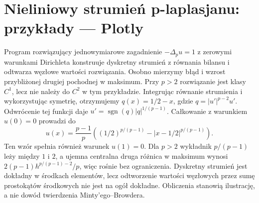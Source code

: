 \section{Nieliniowy strumień p-laplasjanu: przykłady — Plotly}
\label{sec:pde26-code}
Program rozwiązujący jednowymiarowe zagadnienie $-\Delta_pu=1$
z zerowymi warunkami Dirichleta konstruuje dyskretny strumień
z równania bilansu i odtwarza węzłowe wartości rozwiązania.
Osobno mierzymy błąd i wzrost przybliżonej drugiej pochodnej
w maksimum. Przy $p>2$ rozwiązanie jest klasy $C^1$,
lecz nie należy do $C^2$ w tym przykładzie.
Integrując równanie strumienia i wykorzystując
symetrię, otrzymujemy $q(x)=1/2-x$, gdzie
$q=|u'|^{p-2}u'$. Odwrócenie tej funkcji daje
$u'=\operatorname{sgn}(q)|q|^{1/(p-1)}$.
Całkowanie z warunkiem $u(0)=0$ prowadzi do
\[
 u(x)=\frac{p-1}{p}
 \left((1/2)^{p/(p-1)}-|x-1/2|^{p/(p-1)}\right).
\]
Ten wzór spełnia również warunek $u(1)=0$.
Dla $p>2$ wykładnik $p/(p-1)$ leży między $1$ i $2$,
a ujemna centralna druga różnica w maksimum wynosi
$2(p-1)h^{p/(p-1)-2}/p$, więc rośnie bez ograniczenia.
Dyskretny strumień jest dokładny w środkach elementów,
lecz odtworzenie wartości węzłowych przez sumę
prostokątów środkowych nie jest na ogół dokładne.
Obliczenia stanowią ilustrację, a nie dowód
twierdzenia Minty'ego--Browdera.

